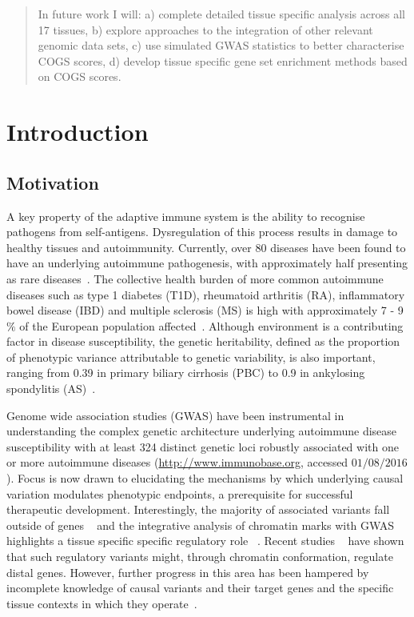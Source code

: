 \documentclass[a4paper,11pt]{report}
\begin{document}
\begin{abstract}
In future work I will: a) complete detailed tissue specific analysis across all 17 tissues, b) explore approaches to the integration of other relevant genomic data sets, c) use simulated GWAS statistics to better characterise COGS scores, d) develop tissue specific gene set enrichment methods based on COGS scores.  
\end{abstract}


\onehalfspacing
\tableofcontents
\clearpage


\chapter{Introduction}
\section{Motivation}

A key property of the adaptive immune system is the ability to recognise pathogens from self-antigens.  Dysregulation of this process results in damage to healthy tissues and autoimmunity. Currently, over 80 diseases have been found to have an underlying autoimmune pathogenesis, with approximately half presenting as rare diseases~\citep{HayterCook2012}. The collective health burden of more common autoimmune diseases such as type 1 diabetes (T1D), rheumatoid arthritis (RA), inflammatory bowel disease (IBD) and multiple sclerosis (MS) is high with approximately 7 - 9$\%$ of the European population affected~\citep{CooperBynumSomers2009}. Although environment is a contributing factor in disease susceptibility, the genetic heritability, defined as the proportion of phenotypic variance attributable to genetic variability, is also important, ranging from 0.39 in primary biliary cirrhosis (PBC) to 0.9 in ankylosing spondylitis (AS)~\citep{Gutierrez-ArcelusRichRaychaudhuri2016}.  

Genome wide association studies (GWAS) have been instrumental in understanding the complex genetic architecture underlying autoimmune disease susceptibility with at least 324 distinct genetic loci robustly associated with one or more autoimmune diseases (\url{http://www.immunobase.org}, accessed $01/08/2016$). Focus is now drawn to elucidating the mechanisms by which underlying causal variation modulates phenotypic endpoints, a prerequisite for successful therapeutic development. Interestingly, the majority of associated variants fall outside of genes ~\citep{MauranoHumbertRynesEtAl2012} and the integrative analysis of chromatin marks with GWAS highlights a tissue specific specific regulatory role ~\citep{FarhMarsonZhuEtAl2015}.  Recent studies ~\citep{ClaussnitzerDankelKimEtAl2015,SmemoTenaKimEtAl2014,Davison2012-zk} have shown that such regulatory variants might, through chromatin conformation, regulate distal genes. However, further progress in this area has been hampered by incomplete knowledge of causal variants and their target genes and the specific tissue contexts in which they operate~\citep{Albert2015-jn}.
\end{document}
